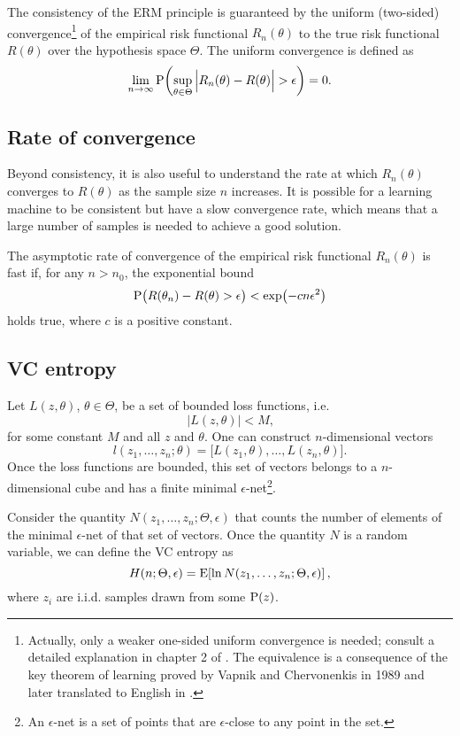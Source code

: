 The consistency of the ERM principle is guaranteed by the uniform (two-sided)
convergence\footnote{Actually, only a weaker one-sided uniform convergence is needed; consult a
detailed explanation in chapter 2 of .  The equivalence is a
consequence of the key theorem of learning proved by Vapnik and Chervonenkis in 1989 and
later translated to English in .} of the empirical risk functional
$R_n(\theta)$ to the true risk functional $R(\theta)$ over the hypothesis space $\Theta$.
The uniform convergence is defined as
\[
  \lim_{n \to \infty} \operatorname{P}\!\left(
    \sup_{\theta \in \Theta} \Big| R_n(\theta) - R(\theta) \Big| > \epsilon
  \right) = 0\text{.}
\]

\subsection{Rate of convergence}

Beyond consistency, it is also useful to understand the rate at which $R_n(\theta)$
converges to $R(\theta)$ as the sample size $n$ increases.  It is possible for a learning
machine to be consistent but have a slow convergence rate, which means that a large number of
samples is needed to achieve a good solution.

The asymptotic rate of convergence of the empirical risk functional $R_n(\theta)$ is
fast if, for any $n > n_0$, the exponential bound
\[
  \operatorname{P}\!\big(R(\theta_n) - R(\theta) > \epsilon\big) < \exp\!\left( - c n \epsilon^2 \right)
\]
holds true, where $c$ is a positive constant.

\subsection{VC entropy}

Let $L(z, \theta)$, $\theta \in \Theta$, be a set of bounded loss functions, i.e.
\[
  \left| L(z, \theta) \right| < M\text{,}
\]
for some constant $M$ and all $z$ and $\theta$.  One can construct $n$-dimensional vectors
\[
  l(z_1, \dots, z_n; \theta) = \big[ L(z_1, \theta), \dots, L(z_n, \theta) \big]\text{.}
\]
Once the loss functions are bounded, this set of vectors belongs to a $n$-dimensional
cube and has a finite minimal $\epsilon$-net\footnote{An $\epsilon$-net is a set of points
that are $\epsilon$-close to any point in the set.}.

Consider the quantity $N(z_1, \dots, z_n; \Theta, \epsilon)$ that counts the number of
elements of the minimal $\epsilon$-net of that set of vectors.
Once the quantity $N$ is a random variable, we can define the VC entropy as
\[
  H(n; \Theta, \epsilon) = \operatorname{E}\!\left[ \ln N(z_1, \dots, z_n; \Theta, \epsilon) \right]\text{,}
\]
where $z_i$ are i.i.d. samples drawn from some $\operatorname{P}(z)$.

